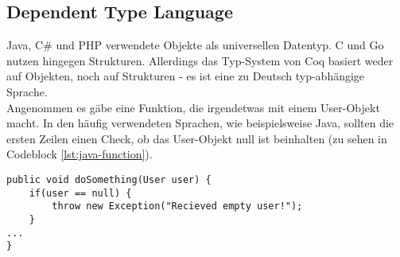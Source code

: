 \subsection{Dependent Type Language}
Java, C\# und PHP verwendete Objekte als universellen Datentyp. C und Go nutzen hingegen Strukturen. Allerdings das Typ-System von Coq basiert weder auf Objekten, noch auf Strukturen - es ist eine zu Deutsch typ-abhängige Sprache.\\
Angenommen es gäbe eine Funktion, die irgendetwas mit einem User-Objekt macht. In den häufig verwendeten Sprachen, wie beispielsweise Java, sollten die ersten Zeilen einen Check, ob das User-Objekt null ist beinhalten (zu sehen in Codeblock \ref{lst:java-function}).
\begin{lstlisting}[language=coq,firstnumber=1,caption=Java Funktion für den initialen Check auf null des User Objektes,label=lst:java-function]
public void doSomething(User user) {
	if(user == null) {
		throw new Exception("Recieved empty user!");
	}
...
}
\end{lstlisting}

